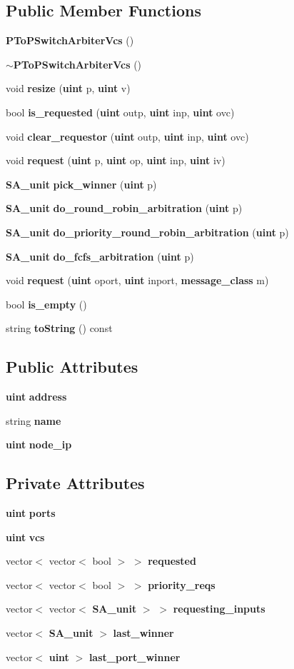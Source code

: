 \subsection*{Public Member Functions}
\begin{CompactItemize}
\item 
{\bf PToPSwitchArbiterVcs} ()
\item 
{\bf $\sim$PToPSwitchArbiterVcs} ()
\item 
void {\bf resize} ({\bf uint} p, {\bf uint} v)
\item 
bool {\bf is\_\-requested} ({\bf uint} outp, {\bf uint} inp, {\bf uint} ovc)
\item 
void {\bf clear\_\-requestor} ({\bf uint} outp, {\bf uint} inp, {\bf uint} ovc)
\item 
void {\bf request} ({\bf uint} p, {\bf uint} op, {\bf uint} inp, {\bf uint} iv)
\item 
{\bf SA\_\-unit} {\bf pick\_\-winner} ({\bf uint} p)
\item 
{\bf SA\_\-unit} {\bf do\_\-round\_\-robin\_\-arbitration} ({\bf uint} p)
\item 
{\bf SA\_\-unit} {\bf do\_\-priority\_\-round\_\-robin\_\-arbitration} ({\bf uint} p)
\item 
{\bf SA\_\-unit} {\bf do\_\-fcfs\_\-arbitration} ({\bf uint} p)
\item 
void {\bf request} ({\bf uint} oport, {\bf uint} inport, {\bf message\_\-class} m)
\item 
bool {\bf is\_\-empty} ()
\item 
string {\bf toString} () const 
\end{CompactItemize}
\subsection*{Public Attributes}
\begin{CompactItemize}
\item 
{\bf uint} {\bf address}
\item 
string {\bf name}
\item 
{\bf uint} {\bf node\_\-ip}
\end{CompactItemize}
\subsection*{Private Attributes}
\begin{CompactItemize}
\item 
{\bf uint} {\bf ports}
\item 
{\bf uint} {\bf vcs}
\item 
vector$<$ vector$<$ bool $>$ $>$ {\bf requested}
\item 
vector$<$ vector$<$ bool $>$ $>$ {\bf priority\_\-reqs}
\item 
vector$<$ vector$<$ {\bf SA\_\-unit} $>$ $>$ {\bf requesting\_\-inputs}
\item 
vector$<$ {\bf SA\_\-unit} $>$ {\bf last\_\-winner}
\item 
vector$<$ {\bf uint} $>$ {\bf last\_\-port\_\-winner}
\end{CompactItemize}


